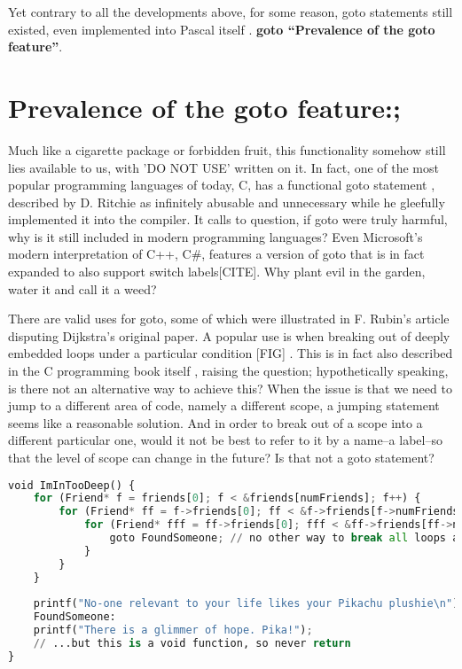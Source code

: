 \documentclass{journal}
\begin{document}
Yet contrary to all the developments above, for some reason, goto statements still existed, even implemented into Pascal itself \cite{pascal}. \textbf{goto ``Prevalence of the goto feature''}.

\section{Prevalence of the goto feature:;}
Much like a cigarette package or forbidden fruit, this functionality somehow still lies available to us, with 'DO NOT USE' written on it.  In fact, one of the most popular programming languages of today, C, has a functional goto statement \cite{cprogramming}, described by D. Ritchie as infinitely abusable and unnecessary \cite{cprogramming} while he gleefully implemented it into the compiler. It calls to question, if goto were truly harmful, why is it still included in modern programming languages? Even Microsoft's modern interpretation of C++, C\#, features a version of goto that is in fact expanded to also support switch labels[CITE]. Why plant evil in the garden, water it and call it a weed?

There are valid uses for goto, some of which were illustrated in F. Rubin's article \cite{gotoodeep} disputing Dijkstra's original paper. A popular use is when breaking out of deeply embedded loops under a particular condition [FIG] \cite{gotoodeep}. This is in fact also described in the C programming book itself \cite{cprogramming}, raising the question; hypothetically speaking, is there not an alternative way to achieve this? When the issue is that we need to jump to a different area of code, namely a different scope, a jumping statement seems like a reasonable solution. And in order to break out of a scope into a different particular one, would it not be best to refer to it by a name--a label--so that the level of scope can change in the future? Is that not a goto statement?

\begin{lstlisting}[language=Python,caption={An example of goto used for breaking loops (C)}]
void ImInTooDeep() {
	for (Friend* f = friends[0]; f < &friends[numFriends]; f++) {
		for (Friend* ff = f->friends[0]; ff < &f->friends[f->numFriends]; ff++) {
			for (Friend* fff = ff->friends[0]; fff < &ff->friends[ff->numFriends]; ff++) {
				goto FoundSomeone; // no other way to break all loops at once
			}
		}
	}
	
	printf("No-one relevant to your life likes your Pikachu plushie\n");
	FoundSomeone:
	printf("There is a glimmer of hope. Pika!");
	// ...but this is a void function, so never return
}
\end{lstlisting}
\end{document}

